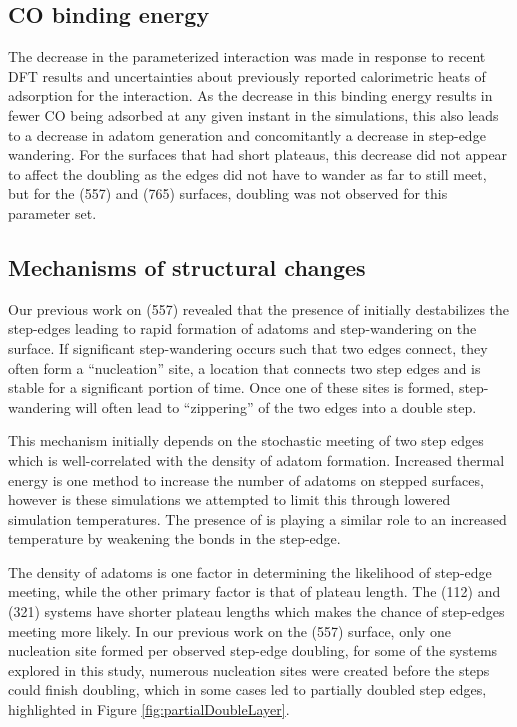 \subsection{CO binding energy}
The decrease in the parameterized  interaction was made in
response to recent DFT results\citep{Deshlahra:2012aa} and uncertainties about
previously reported calorimetric heats of adsorption for the 
interaction.\citep{Yeo:1997th} As the decrease in this binding energy results
in fewer CO being adsorbed at any given instant in the simulations, this also
leads to a decrease in adatom generation and concomitantly a decrease in
step-edge wandering. For the surfaces that had short plateaus, this decrease
did not appear to affect the doubling as the edges did not have to wander as
far to still meet, but for the (557) and (765) surfaces,  doubling was not
observed for this parameter set.

\subsection{Mechanisms of structural changes}
Our previous work on  (557) revealed that the presence of  initially
destabilizes the step-edges leading to rapid formation of adatoms and
step-wandering on the surface. If significant step-wandering occurs such that
two edges connect, they often form a ``nucleation'' site, a location that
connects two step edges and is stable for a significant portion of time. Once
one of these sites is formed, step-wandering will often lead to ``zippering''
of the two edges into a double step. 

This mechanism initially depends on the stochastic meeting of two step edges
which is well-correlated with the density of adatom formation. Increased
thermal energy is one method to increase the number of adatoms on stepped
surfaces, however is these simulations we attempted to limit this through
lowered simulation temperatures.  The presence of  is playing a similar
role to an increased temperature by weakening the  bonds in
the step-edge.

The density of adatoms is one factor in determining the likelihood of step-edge
meeting, while the other primary factor is that of plateau length. The (112)
and (321) systems have shorter plateau lengths which makes the chance of
step-edges meeting more likely.  In our previous work on the (557) surface,
only one nucleation site formed per observed step-edge doubling, for some of
the systems explored in this study, numerous nucleation sites were created
before the steps could finish doubling, which in some cases led to partially
doubled step edges, highlighted in Figure \ref{fig:partialDoubleLayer}.

